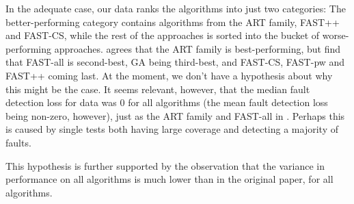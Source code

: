 In the adequate case, our data ranks the algorithms into just two
categories: The better-performing category contains algorithms
from the ART family, FAST++ and FAST-CS, while the rest of
the approaches is sorted into the bucket of worse-performing
approaches. \cite{cruciani2019scalable} agrees that the ART family
is best-performing, but find that FAST-all is second-best, GA being
third-best, and FAST-CS, FAST-pw and FAST++ coming last. At the moment,
we don't have a hypothesis about why this might be the case. It seems
relevant, however, that the median fault detection loss for data was 0 for
all algorithms (the mean fault detection loss being non-zero, however),
just as the ART family and FAST-all in \cite{cruciani2019scalable}.
Perhaps this is caused by single tests both having large coverage and
detecting a majority of faults.

This hypothesis is further supported by the observation that the variance
in performance on all algorithms is much lower than in the original paper,
for all algorithms.

